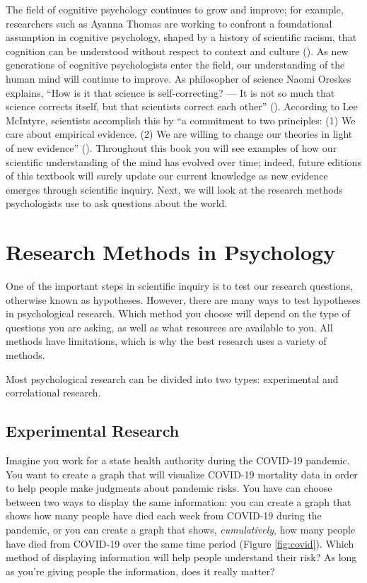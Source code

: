 \documentclass[
]{krantz}
\begin{document}
The field of cognitive psychology continues to grow and improve; for example, researchers such as Ayanna Thomas are working to confront a foundational assumption in cognitive psychology, shaped by a history of scientific racism, that cognition can be understood without respect to context and culture (). As new generations of cognitive psychologists enter the field, our understanding of the human mind will continue to improve. As philosopher of science Naomi Oreskes explains, ``How is it that science is self-correcting? --- It is not so much that science corrects itself, but that scientists correct each other'' (). According to Lee McIntyre, scientists accomplish this by ``a commitment to two principles: (1) We care about empirical evidence. (2) We are willing to change our theories in light of new evidence'' (). Throughout this book you will see examples of how our scientific understanding of the mind has evolved over time; indeed, future editions of this textbook will surely update our current knowledge as new evidence emerges through scientific inquiry. Next, we will look at the research methods psychologists use to ask questions about the world.

\section{Research Methods in Psychology}\label{research-methods-in-psychology}

One of the important steps in scientific inquiry is to test our research questions, otherwise known as hypotheses. However, there are many ways to test hypotheses in psychological research. Which method you choose will depend on the type of questions you are asking, as well as what resources are available to you. All methods have limitations, which is why the best research uses a variety of methods.

Most psychological research can be divided into two types: experimental and correlational research.

\subsection*{Experimental Research}\label{experimental-research}


Imagine you work for a state health authority during the COVID-19 pandemic. You want to create a graph that will visualize COVID-19 mortality data in order to help people make judgments about pandemic risks. You have can choose between two ways to display the same information: you can create a graph that shows how many people have died each week from COVID-19 during the pandemic, or you can create a graph that shows, \emph{cumulatively}, how many people have died from COVID-19 over the same time period (Figure \ref{fig:covid}). Which method of displaying information will help people understand their risk? As long as you're giving people the information, does it really matter?
\end{document}
